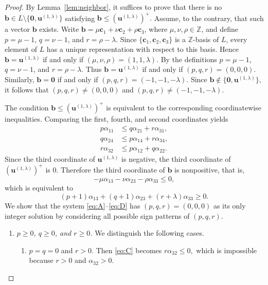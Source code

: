 \documentclass[12pt,a4paper]{amsart}
\theoremstyle{definition}
\begin{document}
\begin{proof} By Lemma~\ref{lem:neighbor}, it suffices to prove that there is no
$
\mathbf b\in
L\setminus\{\mathbf0,\mathbf u^{(1,\lambda)}\}$
satisfying $
\mathbf b\le(\mathbf u^{(1,\lambda)})^+.$ Assume, to the contrary, that such a vector $\mathbf b$ exists.
Write $\mathbf b=\mu\mathbf c_1+\nu\mathbf c_2+\rho\mathbf c_3$, where $\mu,\nu,\rho\in\mathbb Z$, and define
$p=\mu-1$, $q=\nu-1$, and $r=\rho-\lambda$.
Since $\{\mathbf c_1,\mathbf c_2,\mathbf c_3\}$ is a
$\mathbb Z$-basis of $L$, every element of $L$
has a unique representation with respect to this basis. Hence $\mathbf b=\mathbf u^{(1,\lambda)}$ if and only if $(\mu,\nu,\rho)=(1,1,\lambda)$. By the definitions $p=\mu-1$,
$q=\nu-1$, and 
$r=\rho-\lambda$.
Thus $\mathbf b=\mathbf u^{(1,\lambda)}$ if and only if $(p,q,r)=(0,0,0).$
Similarly, $\mathbf b=\mathbf0$ if and only if $(p,q,r)=(-1,-1,-\lambda)$. 
Since
$
\mathbf b\notin
\{\mathbf0,\mathbf u^{(1,\lambda)}\},$
it follows that
$(p,q,r)\neq(0,0,0)$ and 
$
(p,q,r)\neq(-1,-1,-\lambda)$.

The condition
$
\mathbf b\le(\mathbf u^{(1,\lambda)})^+$
is equivalent to the corresponding coordinatewise inequalities.
Comparing the first, fourth, and second coordinates yields
\begin{align}
p\alpha_{11}&\le q\alpha_{21}+r\alpha_{31},\label{eq:A}\\
q\alpha_{24}&\le p\alpha_{14}+r\alpha_{34},\label{eq:B}\\
r\alpha_{32}&\le p\alpha_{12}+q\alpha_{22}.\label{eq:C}
\end{align}
Since the third coordinate of $\mathbf u^{(1,\lambda)}$ is negative,
the third coordinate of $(\mathbf u^{(1,\lambda)})^+$ is $0$. Therefore the third
coordinate of $\mathbf b$ is nonpositive, that is,
\[
-\mu\alpha_{13}-\nu\alpha_{23}-\rho\alpha_{33}\le0,
\]
which is equivalent to
\begin{equation}\label{eq:D}
(p+1)\alpha_{13}+(q+1)\alpha_{23}+(r+\lambda)\alpha_{33}\ge0.
\end{equation}
We show that the system
\eqref{eq:A}--\eqref{eq:D}
has $(p,q,r)=(0,0,0)$ as its only integer solution by considering all
possible sign patterns of $(p,q,r)$.

\begin{enumerate}
\item[\textbf{Case 1.}] \textit{$p\geq0$, $q \geq 0$, and $r \geq 0$.} We distinguish the following cases.
\begin{enumerate}
\item[(a)] $p=q=0$ and $r>0$. Then \eqref{eq:C} becomes $r\alpha_{32}\le0,$
which is impossible because $r>0$ and $\alpha_{32}>0$.


\end{enumerate}
\end{enumerate}
\end{proof}
\end{document}
